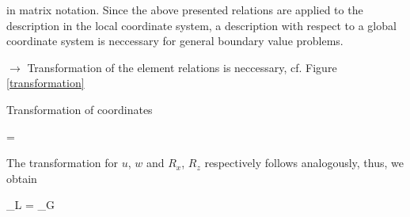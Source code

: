 in matrix notation. 
Since the above presented relations are applied to the 
description in the local coordinate system, a description 
with respect to a global coordinate system is neccessary for 
general boundary value problems.

$\rightarrow$ Transformation of the element relations is 
neccessary, cf. Figure \ref{transformation}

\begin{Figure}[htb]
\begin{center}

\setlength{\baselineskip}{11pt}
\caption{Transformation of coordinates} 
\label{transformation}
\end{center}
\end{Figure}%

\eb
\left[ \begin{array}{c} x_L \\ z_L \end{array} \right] =
\left[ \begin{array}{c} x_G \\ z_G \end{array} \right]
\ee

The transformation for $u$, $w$ and $R_x$, $R_z$ respectively 
follows analogously, thus, we obtain 

\eb
{}_L = 
_G
\ee


